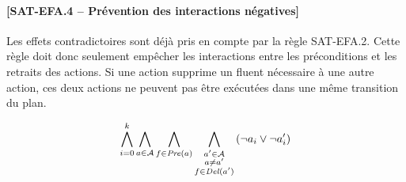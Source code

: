 \paragraph*{[SAT-EFA.4 -- Prévention des interactions négatives]}%
Les effets contradictoires sont déjà pris en compte par la règle SAT-EFA.2.
Cette règle doit donc seulement empêcher les interactions entre les préconditions et les retraits des actions. Si une action supprime un fluent nécessaire à une autre action, ces deux actions ne peuvent pas être exécutées dans une même transition du plan.

\[ \bigwedge\limits_{\substack{i=0}}^{k} \bigwedge\limits_{\substack{a \in \mathcal{A}}} \bigwedge\limits_{\substack{f\in \mathit{Pre}(a)}} \bigwedge\limits_{\substack{a' \in \mathcal{A} \\ a \neq a' \\ f \in \mathit{Del}(a')}}\left(\neg a_{i} \vee \neg a'_{i}\right) \]

